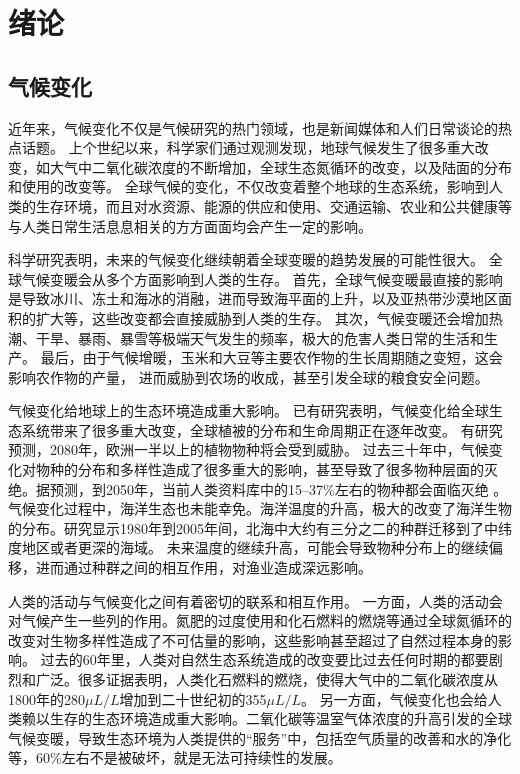 \chapter{绪论}
\label{cha:intro}

\section{气候变化}

近年来，气候变化不仅是气候研究的热门领域，也是新闻媒体和人们日常谈论的热点话题。
上个世纪以来，科学家们通过观测发现，地球气候发生了很多重大改变，如大气中二氧化碳浓度的不断增加，全球生态氮循环的改变，以及陆面的分布和使用的改变等\cite{vitousek1994beyond}。
全球气候的变化，不仅改变着整个地球的生态系统，影响到人类的生存环境，而且对水资源、能源的供应和使用、交通运输、农业和公共健康等与人类日常生活息息相关的方方面面均会产生一定的影响\cite{karl2009global}。



科学研究表明，未来的气候变化继续朝着全球变暖的趋势发展的可能性很大\cite{solomon2007climate,stocker2013ipcc}。
全球气候变暖会从多个方面影响到人类的生存。
首先，全球气候变暖最直接的影响是导致冰川、冻土和海冰的消融，进而导致海平面的上升，以及亚热带沙漠地区面积的扩大等，这些改变都会直接威胁到人类的生存\cite{stocker2013ipcc}。
其次，气候变暖还会增加热潮、干旱、暴雨、暴雪等极端天气发生的频率，极大的危害人类日常的生活和生产\cite{solomon2007climate}。
最后，由于气候增暖，玉米和大豆等主要农作物的生长周期随之变短，这会影响农作物的产量， 进而威胁到农场的收成，甚至引发全球的粮食安全问题\cite{battisti2009historical,adams1990global,smith1989potential}。 


气候变化给地球上的生态环境造成重大影响。
已有研究表明，气候变化给全球生态系统带来了很多重大改变，全球植被的分布和生命周期正在逐年改变\cite{parmesan2003globally}。 
有研究预测，2080年，欧洲一半以上的植物物种将会受到威胁\cite{thuiller2005climate}。
过去三十年中，气候变化对物种的分布和多样性造成了很多重大的影响，甚至导致了很多物种层面的灭绝。据预测，到2050年，当前人类资料库中的15–37\%左右的物种都会面临灭绝 \cite{thomas2004extinction} 。
气候变化过程中，海洋生态也未能幸免。海洋温度的升高，极大的改变了海洋生物的分布。研究显示1980年到2005年间，北海中大约有三分之二的种群迁移到了中纬度地区或者更深的海域\cite{perry2005climate}。
未来温度的继续升高，可能会导致物种分布上的继续偏移，进而通过种群之间的相互作用，对渔业造成深远影响。

人类的活动与气候变化之间有着密切的联系和相互作用。
一方面，人类的活动会对气候产生一些列的作用。氮肥的过度使用和化石燃料的燃烧等通过全球氮循环的改变对生物多样性造成了不可估量的影响，这些影响甚至超过了自然过程本身的影响。
过去的60年里，人类对自然生态系统造成的改变要比过去任何时期的都要剧烈和广泛。很多证据表明，人类化石燃料的燃烧，使得大气中的二氧化碳浓度从1800年的280$\mu L/L$增加到二十世纪初的355$\mu L/L$\cite{vitousek1994beyond}。
另一方面，气候变化也会给人类赖以生存的生态环境造成重大影响。二氧化碳等温室气体浓度的升高引发的全球气候变暖，导致生态环境为人类提供的“服务”中，包括空气质量的改善和水的净化等，60\%左右不是被破坏，就是无法可持续性的发展\cite{assessment2005ecosystems}。

